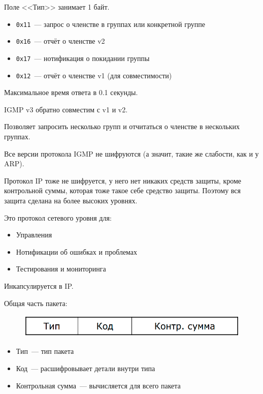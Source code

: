 Поле <<Тип>> занимает 1 байт.
\begin{itemize}
    \item {\tt 0x11}~--- запрос о членстве в группах или конкретной группе
    \item {\tt 0x16}~--- отчёт о членстве v2
    \item {\tt 0x17}~--- нотификация о покидании группы
    \item {\tt 0x12}~--- отчёт о членстве v1 (для совместимости)
\end{itemize}

Максимальное время ответа в 0.1 секунды.

IGMP v3 обратно совместим с v1 и v2.

Позволяет запросить несколько групп и отчитаться о членстве в нескольких группах.

Все версии протокола IGMP не шифруются (а значит, такие же слабости, как и у ARP).

Протокол IP тоже не шифруется, у него нет никаких средств защиты, кроме контрольной суммы, которая тоже такое себе средство защиты. Поэтому вся защита сделана на более высоких уровнях.


Это протокол сетевого уровня для:
\begin{itemize}
    \item Управления
    \item Нотификации об ошибках и проблемах
    \item Тестирования и мониторинга
\end{itemize}

Инкапсулируется в IP. 

Общая часть пакета:

\begin{figure}[H]
  \centering
  \includegraphics[width=15cm]{images/02/09}
\end{figure}

\begin{itemize}
    \item Тип~--- тип пакета
    \item Код~--- расшифровывает детали внутри типа
    \item Контрольная сумма~--- вычисляется для всего пакета
\end{itemize}

